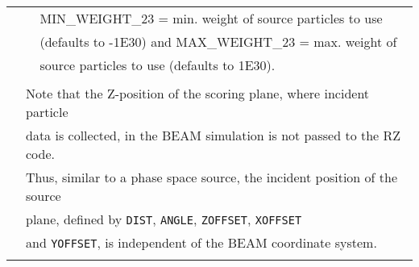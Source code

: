 \begin{longtable}{lll}
  &            & MIN\_WEIGHT\_23 = min. weight of source particles to use\\
  &            & (defaults to -1E30) and MAX\_WEIGHT\_23 = max. weight of\\
  &            & source particles to use (defaults to 1E30).\\
  &&\\
  & \multicolumn{2}{l}{Note that the Z-position of the scoring plane, where incident particle}\\
  & \multicolumn{2}{l}{data is collected, in the BEAM simulation is not passed to the RZ code.}\\
  & \multicolumn{2}{l}{Thus, similar to a phase space source, the incident position of the source}\\
  & \multicolumn{2}{l}{plane, defined by {\tt DIST}, {\tt ANGLE}, {\tt ZOFFSET}, {\tt XOFFSET}}\\
  & \multicolumn{2}{l}{and {\tt YOFFSET}, is independent of the BEAM coordinate system.}\\
\hline
\label{tab:srcrz}
\end{longtable}
